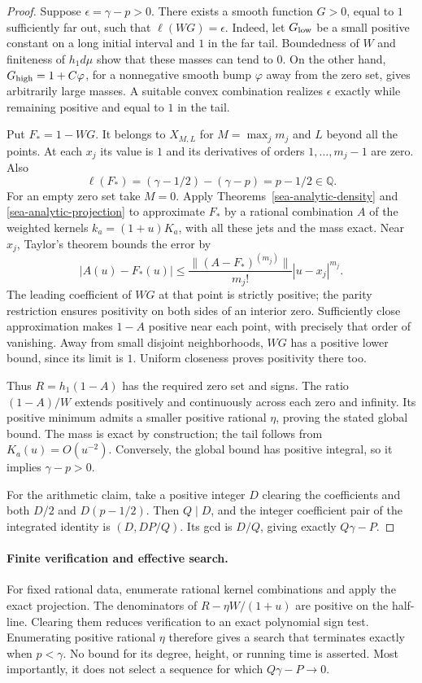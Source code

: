 \documentclass[11pt,a4paper]{article}
\theoremstyle{definition}
\theoremstyle{remark}
\begin{document}
\begin{proof}
Suppose $\epsilon=\gamma-p>0$. There exists a smooth function $G>0$,
equal to $1$ sufficiently far out, such that $\ell(WG)=\epsilon$.
Indeed, let $G_{\rm low}$ be a small positive constant on a long initial
interval and $1$ in the far tail. Boundedness of $W$ and finiteness of
$h_1d\mu$ show that these masses can tend to $0$. On the other hand,
$G_{\rm high}=1+C\varphi$, for a nonnegative smooth bump $\varphi$
away from the zero set, gives arbitrarily large masses. A suitable convex
combination realizes $\epsilon$ exactly while remaining positive and
equal to $1$ in the tail.

Put $F_*=1-WG$. It belongs to $X_{M,L}$ for
$M=\max_jm_j$ and $L$ beyond all the points. At each $x_j$ its value is
$1$ and its derivatives of orders $1,\ldots,m_j-1$ are zero. Also
\[
\ell(F_*)=(\gamma-1/2)-(\gamma-p)=p-1/2\in\mathbb Q.
\]
For an empty zero set take $M=0$. Apply
Theorems~\ref{sea-analytic-density} and \ref{sea-analytic-projection}
to approximate $F_*$ by a rational combination $A$ of the weighted kernels
$k_a=(1+u)K_a$, with all these
jets and the mass exact. Near $x_j$, Taylor's theorem bounds the error by
\[
|A(u)-F_*(u)|\leq
\frac{\|(A-F_*)^{(m_j)}\|}{m_j!}|u-x_j|^{m_j}.
\]
The leading coefficient of $WG$ at that point is strictly positive;
the parity restriction ensures positivity on both sides of an interior
zero. Sufficiently close approximation makes $1-A$ positive near each
point, with precisely that order of vanishing. Away from small disjoint
neighborhoods, $WG$ has a positive lower bound, since its limit is $1$.
Uniform closeness proves positivity there too.

Thus $R=h_1(1-A)$ has the required zero set and signs. The ratio
$(1-A)/W$ extends positively and continuously across each zero and
infinity. Its positive minimum admits a smaller positive rational
$\eta$, proving the stated global bound. The mass is exact by construction;
the tail follows from $K_a(u)=O(u^{-2})$. Conversely, the global bound
has positive integral, so it implies $\gamma-p>0$.

For the arithmetic claim, take a positive integer $D$ clearing the
coefficients and both $D/2$ and $D(p-1/2)$. Then $Q\mid D$, and the
integer coefficient pair of the integrated identity is
$(D,DP/Q)$. Its gcd is $D/Q$, giving exactly $Q\gamma-P$.
\end{proof}

\paragraph{Finite verification and effective search.}
For fixed rational data, enumerate rational kernel combinations and apply
the exact projection. The denominators of $R-\eta W/(1+u)$ are positive
on the half-line. Clearing them reduces verification to an exact polynomial
sign test. Enumerating positive rational $\eta$ therefore gives a search
that terminates exactly when $p<\gamma$. No bound for its degree, height,
or running time is asserted. Most importantly, it does not select a
sequence for which $Q\gamma-P\to0$.
\end{document}

